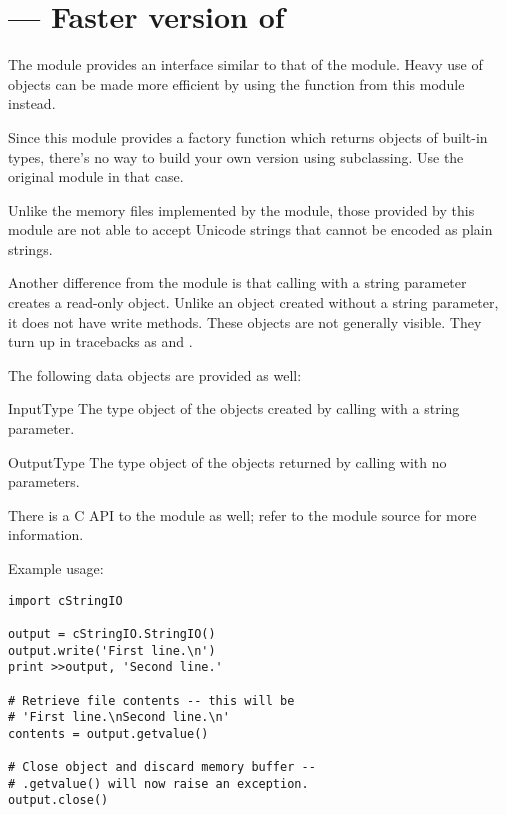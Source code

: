 \section{ ---
         Faster version of }


The module  provides an interface similar to that of
the  module.  Heavy use of 
objects can be made more efficient by using the function
 from this module instead.

Since this module provides a factory function which returns objects of
built-in types, there's no way to build your own version using
subclassing.  Use the original  module in that case.

Unlike the memory files implemented by the 
module, those provided by this module are not able to accept Unicode
strings that cannot be encoded as plain \ASCII{} strings.

Another difference from the  module is that calling
 with a string parameter creates a read-only object.
Unlike an object created without a string parameter, it does not have
write methods.  These objects are not generally visible.  They turn up in
tracebacks as  and .

The following data objects are provided as well:


\begin{datadesc}{InputType}
  The type object of the objects created by calling
   with a string parameter.
\end{datadesc}

\begin{datadesc}{OutputType}
  The type object of the objects returned by calling
   with no parameters.
\end{datadesc}


There is a C API to the module as well; refer to the module source for 
more information.

Example usage:

\begin{verbatim}
import cStringIO

output = cStringIO.StringIO()
output.write('First line.\n')
print >>output, 'Second line.'

# Retrieve file contents -- this will be
# 'First line.\nSecond line.\n'
contents = output.getvalue()

# Close object and discard memory buffer -- 
# .getvalue() will now raise an exception.
output.close()
\end{verbatim}

